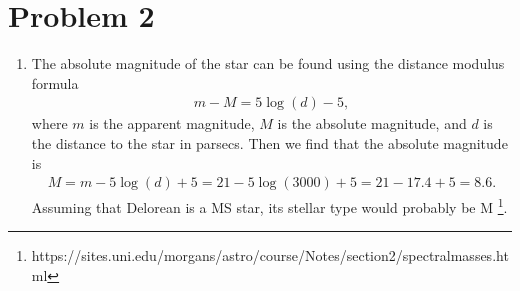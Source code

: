 \documentclass[11pt,letterpaper]{article}
\begin{document}
\section*{Problem 2}
\begin{enumerate}[label=(\alph*)]
        
    \item The absolute magnitude of the star can be found using the distance modulus formula 
        \begin{align*}
            m - M = 5\log(d) - 5,
        \end{align*}
        where $m$ is the apparent magnitude, $M$ is the absolute magnitude, and $d$ is the distance to the star in parsecs. Then we find that the absolute magnitude is
        \begin{align*}
            M = m - 5\log(d) + 5 = 21 - 5\log(3000) + 5 = 21 - 17.4 + 5 = 8.6.
        \end{align*}
        Assuming that Delorean is a MS star, its stellar type would probably be M \footnote{https://sites.uni.edu/morgans/astro/course/Notes/section2/spectralmasses.html}.


\end{enumerate}
\end{document}
